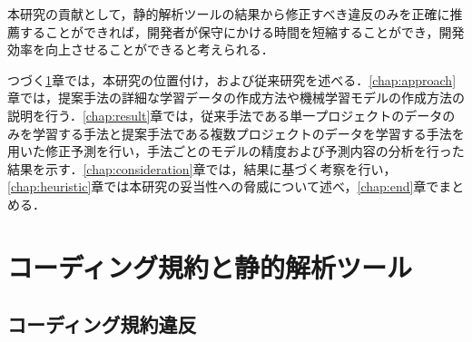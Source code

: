 \documentclass[submit,noauthor,ses,dvipdfmx]{ipsj}
\begin{document}
本研究の貢献として，静的解析ツールの結果から修正すべき違反のみを正確に推薦することができれば，開発者が保守にかける時間を短縮することができ，開発効率を向上させることができると考えられる．

つづく\ref{chap:background}章では，本研究の位置付け，および従来研究を述べる．\ref{chap:approach}章では，提案手法の詳細な学習データの作成方法や機械学習モデルの作成方法の説明を行う．\ref{chap:result}章では，従来手法である単一プロジェクトのデータのみを学習する手法と提案手法である複数プロジェクトのデータを学習する手法を用いた修正予測を行い，手法ごとのモデルの精度および予測内容の分析を行った結果を示す．\ref{chap:consideration}章では，結果に基づく考察を行い，\ref{chap:heuristic}章では本研究の妥当性への脅威について述べ，\ref{chap:end}章でまとめる．

\section{コーディング規約と静的解析ツール}\label{chap:background}

\subsection{コーディング規約違反}



\end{document}
